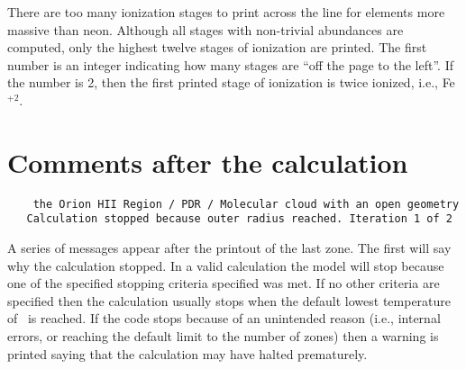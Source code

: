 There are too many ionization stages to print across the line for elements
more massive than neon.
Although all stages with non-trivial abundances
are computed, only the highest twelve stages of ionization are printed.
The first number is an integer indicating how many stages are ``off the
page to the left''.
If the number is 2, then the first printed stage of
ionization is twice ionized, i.e., Fe$^{+2}$.

\section{Comments after the calculation}
\label{sec:CommentsAfterCalculation}

{\setverbatimfontsize{\tiny}
\begin{verbatim}
    the Orion HII Region / PDR / Molecular cloud with an open geometry
   Calculation stopped because outer radius reached. Iteration 1 of 2
\end{verbatim}
}
A series of messages appear after the printout of the last zone.
The
first will say why the calculation stopped.
In a valid calculation the
model will stop because one of the specified stopping criteria specified
was met.
If no other criteria are specified then the calculation usually
stops when the default lowest temperature of
\TEMPSTOPDEFAULT\ is reached.
If the
code stops because of an unintended reason (i.e., internal errors, or
reaching the default limit to the number of zones) then a warning is printed
saying that the calculation may have halted prematurely.

